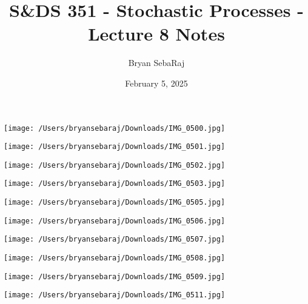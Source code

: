 \documentclass{article}
\title{S\&DS 351 - Stochastic Processes - Lecture 8 Notes}
\author{Bryan SebaRaj}
\date{February 5, 2025}
\begin{document}
\maketitle


\texttt{[image: /Users/bryansebaraj/Downloads/IMG\_0500.jpg]}

\texttt{[image: /Users/bryansebaraj/Downloads/IMG\_0501.jpg]}


\texttt{[image: /Users/bryansebaraj/Downloads/IMG\_0502.jpg]}


\texttt{[image: /Users/bryansebaraj/Downloads/IMG\_0503.jpg]}


\texttt{[image: /Users/bryansebaraj/Downloads/IMG\_0505.jpg]}


\texttt{[image: /Users/bryansebaraj/Downloads/IMG\_0506.jpg]}


\texttt{[image: /Users/bryansebaraj/Downloads/IMG\_0507.jpg]}

\texttt{[image: /Users/bryansebaraj/Downloads/IMG\_0508.jpg]}


\texttt{[image: /Users/bryansebaraj/Downloads/IMG\_0509.jpg]}




\texttt{[image: /Users/bryansebaraj/Downloads/IMG\_0511.jpg]}


\end{document}
